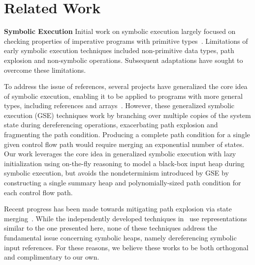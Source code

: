 \section{Related Work}

\noindent\textbf{Symbolic Execution} 
Initial work on symbolic execution largely focused on checking
properties of imperative programs with primitive
types~\cite{Clarke:76,King:76}. Limitations of early symbolic execution techniques included non-primitive data types, path explosion and non-symbolic operations. Subsequent adaptations have sought to overcome these limitations.

To address the issue of references, several projects have generalized
the core idea of symbolic execution, enabling it to be applied to
programs with more general types, including references and
arrays~\cite{GSE03,KiasanKunit,Cadar:2008,Rosner:2015}. However, these generalized symbolic execution (GSE) techniques work by branching over multiple copies of the system state during dereferencing operations, exacerbating path explosion and fragmenting the path condition. Producing a complete path condition for a single given control flow path would require merging an exponential number of states. Our work leverages the core idea in generalized symbolic execution with lazy initialization using on-the-fly reasoning to model a black-box input heap during
symbolic execution, but avoids the nondeterminism introduced by GSE by
constructing a single summary heap and polynomially-sized path condition for each control flow path.

Recent progress has been made towards mitigating path explosion via state merging~\cite{Kuznetsov:2012,Sen:2014,Torlak:2014}. While the independently developed techniques in~\cite{Sen:2014,Torlak:2014} use representations similar to the one presented here, none of these techniques address the fundamental issue concerning symbolic heaps, namely dereferencing symbolic input references. For these reasons, we believe these works to be both orthogonal and complimentary to our own.

